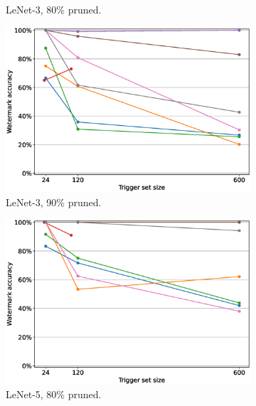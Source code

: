 \begin{figure}
\begin{subfigure}{0.4\linewidth}
        \caption{LeNet-3, 80\% pruned.}
        \label{fig:pruning-0.8-lenet3}
    \end{subfigure}
    \quad
    \begin{subfigure}{0.4\linewidth}
        \includegraphics[width=\linewidth]{images/pruning/lenet3_pruning_per_arch_09.eps}
        \caption{LeNet-3, 90\% pruned.}
        \label{fig:pruning-0.9-lenet3}
    \end{subfigure}
    \quad
    \begin{subfigure}{0.4\linewidth}
        \includegraphics[width=\linewidth]{images/pruning/lenet5_pruning_per_arch_08.eps}
        \caption{LeNet-5, 80\% pruned.}
        \label{fig:pruning-0.8-lenet5}
    \end{subfigure}
    \quad
    \begin{subfigure}{0.4\linewidth}

\end{subfigure}
\end{figure}

